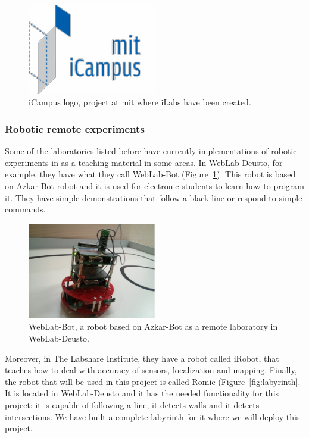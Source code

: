 \begin{figure}[!htbp]
	\centering
	\includegraphics[width=0.5\textwidth]{fig/icampus}
	\caption{iCampus logo, project at \acrshort{mit} where iLabs have been created.}
\end{figure}

\subsubsection{Robotic remote experiments}

Some of the laboratories listed before have currently implementations of robotic experiments in
as a teaching material in some areas. In WebLab-Deusto, for example, they have what they call
WebLab-Bot (Figure~\ref{fig:weblab-bot}). This robot is based on Azkar-Bot robot and it is used for
electronic students to learn how to program it. They have simple demonstrations that follow a black
line or respond to simple commands.

\begin{figure}[!htbp]
	\centering
	\includegraphics[width=0.5\textwidth]{fig/weblab-bot}
	\caption{WebLab-Bot, a robot based on Azkar-Bot as a remote laboratory in
	WebLab-Deusto.}\label{fig:weblab-bot}
\end{figure}

Moreover, in The Labshare Institute, they have a robot called iRobot, that teaches how to deal with
accuracy of sensors, localization and mapping. Finally, the robot that will be used in this
project is called Romie (Figure~\ref{fig:labyrinth}. It is located in WebLab-Deusto and it has the
needed functionality for this project: it is capable of following a line, it detects walls and it
detects intersections. We have built a complete labyrinth for it where we will deploy this project.

